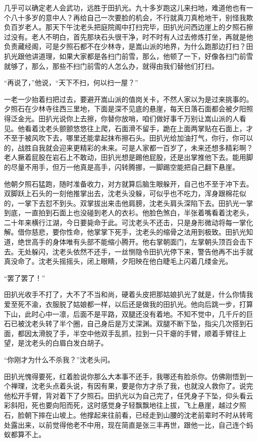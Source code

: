 几乎可以确定老人会武功，远胜于田扒光。九十多岁跑这儿来扫地，难道他也有一个八十多岁的意中人？再给自己一次要脸的机会，不行就真刀真枪地干，别怪我欺负百岁老人。那天下午沈老头把庭院阁中打扫完毕，田扒光问西边崖上的夕照石擦过没有。老人不明白，首先那块石头很干净，时不时有人过去修炼打坐，再就是他负责藏经阁，可是夕照石都不在少林寺，是嵩山派的地界，为什么跑那边打扫？田扒光跟他讲道理，如果大家都是各扫门前雪，那么，他顿了一下，好像各扫门前雪就够了，那么，那些不扫门前雪的人怎么办，就得由我们替他们打扫。

“再说了，”他说，“天下不扫，何以扫一屋？”

一老一少抬着扫把过去，要避开嵩山派的值岗关卡，不然人家以为是过来挑事的。夕照石在少林寺往西三里地，下面是深不见底的悬崖，每天日落石面都会被夕阳照得泛金光。田扒光说你上去擦，你替你放哨，咱们做好事千万别让嵩山派的人看见。他看着沈老头颤颤悠悠往上爬，石面滑不留手，跪在上面两掌贴在石面上，才不至于被风吹下去，哪里还能拿起抹布擦石头。田扒光给加油打气，你行，你可以的，战胜自我就会迎来更精彩的未来。可是人家都一百岁了，未来还想多精彩啊？老人撅着屁股在岩石上不敢动，田扒光想是踢他屁股，还是出掌推他下去。能用脚的尽量不用手，但万一他真是高手，闪转腾挪，一脚踢空能把自己翻下悬崖。

他朝夕照石猛跑，随时准备收力，对方就算后脑生眼躲开，自己也不至于冲下去。双脚跃上石头的一刻他推掌出去，沈老头没躲，可似乎也不吃力，浑身跟棉花似的，一掌下去怼不到头。双掌拔出来击他肩膀，沈老头肩头深陷下去。田扒光一掌到底，一直拍到石面上也没碰到老人的衣衫。他脸色煞白，半张着嘴看着沈老头，二十年来横行江湖，今日要毙命于此。可沈老头不还击，只是身形微动将每一掌化解。借你慈悲，要你性命，他掌掌下死手，沈老头的缩骨之法用到极致。田扒光知道，绝世高手的身体唯有头部不能缩小腾开。他右掌朝面门，左掌朝头顶百会击下去。无处躲闪，沈老头依然不还手，一丝恻隐令田扒光停下来，警告他再不出手就真没命了。沈老头摇摇头，闭上眼睛，夕阳映在他白睫毛上闪着几缕金光。

“罢了罢了！”

田扒光收手不打了，大不了不当和尚，硬着头皮把那姑娘扒光了就是，什么你情我爱至死不渝，衣服脱了姑娘都一样，以后还是做我的田扒光。他向后跳一步，打算下山，此时心中一凛，后面不是平路，双腿还没有着地。不知不觉中，几千斤的巨石已被沈老头转了半个圈，自己身后是万丈深渊。双腿不断下坠，指尖几次搭到石面，都因太滑脱了手，半空中他双手乱抓，拉到一只干瘪的手臂，顺着手臂往上望，是沈老头的白眉白发白胡子。

“你刚才为什么不杀我？”沈老头问。

田扒光愧得要死，红着脸说你那么大本事不还手，我哪还有脸杀你。仿佛刚悟到一个禅理，沈老头点着头说，有因有果，要是你方才杀了我，也就没人救你了。说完他松开手臂，背对着下了夕照石。田扒光以为自己完了，任凭身子下坠，仰头看云彩斜阳，死也要向阳而死，这时感觉身子轻飘飘地往上拔，飞上悬崖，越过夕照石，脸朝下摔在山坡上。他撑起来往前看，已经走到山腰的沈老前辈时不时从转弯处露出来，以前觉得他老不中用，现在简直是张三丰再世，跟他一比，自己连个蚂蚁都算不上。
\newline

